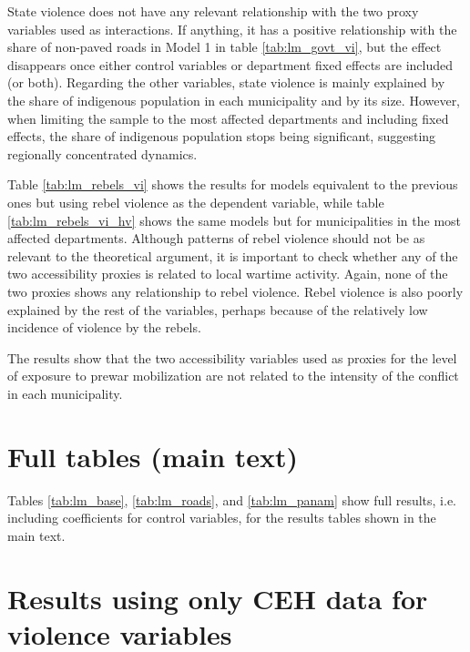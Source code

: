 \documentclass[a4paper, 12pt, notitlepage]{article}
\begin{document}
State violence does not have any relevant relationship with the two proxy variables used as interactions.
If anything, it has a positive relationship with the share of non-paved roads in Model 1 in table \ref{tab:lm_govt_vi}, but the effect disappears once either control variables or department fixed effects are included (or both).
Regarding the other variables, state violence is mainly explained by the share of indigenous population in each municipality and by its size.
However, when limiting the sample to the most affected departments and including fixed effects, the share of indigenous population stops being significant, suggesting regionally concentrated dynamics.

Table \ref{tab:lm_rebels_vi} shows the results for models equivalent to the previous ones but using rebel violence as the dependent variable, while table \ref{tab:lm_rebels_vi_hv} shows the same models but for municipalities in the most affected departments.
Although patterns of rebel violence should not be as relevant to the theoretical argument, it is important to check whether any of the two accessibility proxies is related to local wartime activity.
Again, none of the two proxies shows any relationship to rebel violence.
Rebel violence is also poorly explained by the rest of the variables, perhaps because of the relatively low incidence of violence by the rebels.

The results show that the two accessibility variables used as proxies for the level of exposure to prewar mobilization are not related to the intensity of the conflict in each municipality.






\clearpage
\section{Full tables (main text)}\label{app:results_tablong}

Tables \ref{tab:lm_base}, \ref{tab:lm_roads}, and \ref{tab:lm_panam} show full results, i.e. including coefficients for control variables, for the results tables shown in the main text.







\clearpage
\section{Results using only CEH data for violence variables}\label{app:results_ceh}
\end{document}
